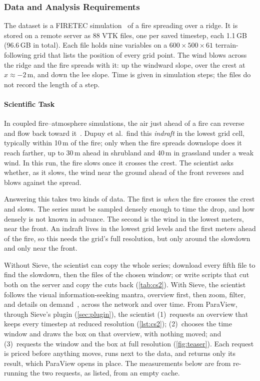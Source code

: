 \documentclass{vgtc}
\newcommand{\sname}{Sieve}
\begin{document}
\subsubsection{Data and Analysis Requirements}

The dataset is a FIRETEC simulation~\cite{linn2002firetec} of a fire spreading over a
ridge. It is stored on a remote server as 88 VTK files, one per saved timestep, each
1.1\,GB (96.6\,GB in total). Each file holds nine variables on a $600 \times 500 \times 61$
terrain-following grid that lists the position of every grid point. The wind blows across
the ridge and the fire spreads with it: up the windward slope, over the crest at
$x \approx -2$\,m, and down the lee slope. Time is given in simulation steps; the files do
not record the length of a step.

\paragraph{Scientific Task}
In coupled fire--atmosphere simulations, the air just ahead of a fire can reverse and flow
back toward it~\cite{dupuy2011indraft}. Dupuy et al.\ find this \emph{indraft} in the lowest
grid cell, typically within 10\,m of the fire; only when the fire spreads downslope does it
reach farther, up to 30\,m ahead in shrubland and 40\,m in grassland under a weak wind. In this run, the fire slows once it crosses the crest. The
scientist asks whether, as it slows, the wind near the ground ahead of the front reverses
and blows against the spread.

Answering this takes two kinds of data. The first is \emph{when} the fire crosses the crest
and slows. The series must be sampled densely enough to time the drop, and how densely is
not known in advance. The second is the wind in the lowest meters, near the front. An
indraft lives in the lowest grid levels and the first meters ahead of the fire, so this
needs the grid's full resolution, but only around the slowdown and only near the front.

Without \sname{}, the scientist can copy the whole series; download every fifth file to
find the slowdown, then the files of the chosen window; or write scripts that cut both on
the server and copy the cuts back (\cref{tab:cs2}). With \sname{}, the scientist follows
the visual information-seeking mantra, overview first, then zoom, filter, and details on
demand~\cite{shneiderman1996eyes}, across the network and over time. From ParaView,
through \sname{}'s plugin (\cref{sec:plugin}), the scientist
(1)~requests an overview that keeps every timestep at reduced resolution
(\cref{lst:cs2});
(2)~chooses the time window and draws the box on that overview, with nothing moved; and
(3)~requests the window and the box at full resolution (\cref{fig:teaser}).
Each request is priced before anything moves, runs next to the data, and returns only its
result, which ParaView opens in place. The measurements below are from re-running the two
requests, as listed, from an empty cache.
\end{document}
